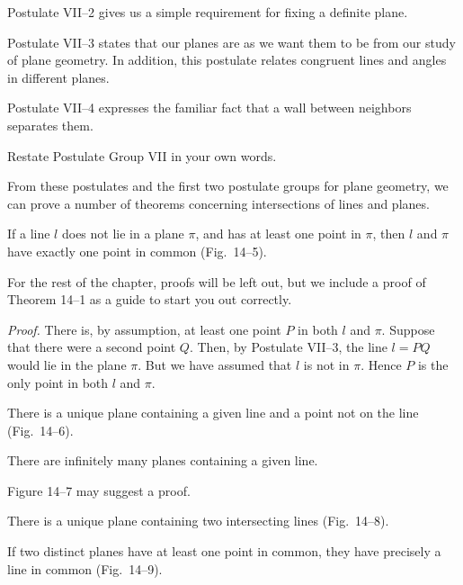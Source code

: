 \documentclass[11pt]{book}
\theoremstyle{bkplain}
\theoremstyle{XIplainnote}
\theoremstyle{bkplain}
\theoremstyle{bkplain}
\begin{document}
Postulate VII--2 gives us a simple requirement for fixing a definite plane.

Postulate VII--3 states that our planes are as we want them to be from our study
of plane geometry. In addition, this postulate relates congruent lines and
angles in different planes.

Postulate VII--4 expresses the familiar fact that a wall between neighbors
separates them.

\FIGXIVFOURFIVE

Restate Postulate Group VII in your own words.

From these postulates and the first two postulate groups for plane geometry, we
can prove a number of theorems concerning intersections of lines and planes.

\begin{theorem}
If a line $l$ does not lie in a plane $\pi$, and has at least one point in
$\pi$, then $l$ and $\pi$ have exactly one point in common (Fig.~14--5).
\end{theorem}

For the rest of the chapter, proofs will be left out, but we include a proof of
Theorem 14--1 as a guide to start you out correctly.

\noindent\emph{Proof.} There is, by assumption, at least one point $P$ in both
$l$ and $\pi$. Suppose that there were a second point $Q$. Then, by Postulate
VII--3, the line $l = PQ$ would lie in the plane $\pi$. But we have assumed that
$l$ is not in $\pi$. Hence $P$ is the only point in both $l$ and $\pi$.

\FIGXIVSIXSEVEN

\begin{theorem}
There is a unique plane containing a given line and a point not on the line
(Fig.~14--6).
\end{theorem}

\begin{theorem}
There are infinitely many planes containing a given line.
\end{theorem}

\noindent Figure 14--7 may suggest a proof.

\begin{theorem}
There is a unique plane containing two intersecting lines (Fig.~14--8).
\end{theorem}

\begin{theorem}
If two distinct planes have at least one point in common, they have precisely a
line in common (Fig.~14--9).
\end{theorem}
\end{document}
